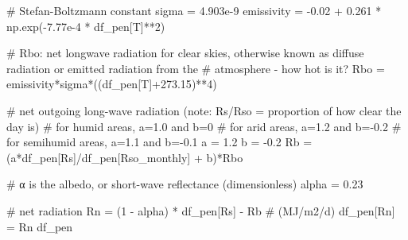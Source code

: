 \documentclass[
  letterpaper,
  DIV=11,
  numbers=noendperiod]{scrreprt}
\newenvironment{Shaded}{\begin{snugshade}}{\end{snugshade}}
\newcommand{\CommentTok}[1]{\textcolor[rgb]{0.37,0.37,0.37}{#1}}
\newcommand{\DecValTok}[1]{\textcolor[rgb]{0.68,0.00,0.00}{#1}}
\newcommand{\FloatTok}[1]{\textcolor[rgb]{0.68,0.00,0.00}{#1}}
\newcommand{\NormalTok}[1]{\textcolor[rgb]{0.00,0.23,0.31}{#1}}
\newcommand{\OperatorTok}[1]{\textcolor[rgb]{0.37,0.37,0.37}{#1}}
\newcommand{\StringTok}[1]{\textcolor[rgb]{0.13,0.47,0.30}{#1}}
\begin{document}
\begin{Shaded}
\begin{Highlighting}[]
\CommentTok{\# Stefan{-}Boltzmann constant}
\NormalTok{sigma }\OperatorTok{=} \FloatTok{4.903e{-}9}
\NormalTok{emissivity }\OperatorTok{=} \OperatorTok{{-}}\FloatTok{0.02} \OperatorTok{+} \FloatTok{0.261} \OperatorTok{*}\NormalTok{ np.exp(}\OperatorTok{{-}}\FloatTok{7.77e{-}4} \OperatorTok{*}\NormalTok{ df\_pen[}\StringTok{\textquotesingle{}T\textquotesingle{}}\NormalTok{]}\OperatorTok{**}\DecValTok{2}\NormalTok{)}

\CommentTok{\# Rbo: net longwave radiation for clear skies, otherwise known as diffuse radiation or emitted radiation from the}
\CommentTok{\# atmosphere {-} \textquotesingle{}how hot is it?\textquotesingle{}}
\NormalTok{Rbo }\OperatorTok{=}\NormalTok{ emissivity}\OperatorTok{*}\NormalTok{sigma}\OperatorTok{*}\NormalTok{((df\_pen[}\StringTok{\textquotesingle{}T\textquotesingle{}}\NormalTok{]}\OperatorTok{+}\FloatTok{273.15}\NormalTok{)}\OperatorTok{**}\DecValTok{4}\NormalTok{)}

\CommentTok{\# net outgoing long{-}wave radiation (note: Rs/Rso = proportion of how clear the day is)}
\CommentTok{\# for humid areas, a=1.0 and b=0}
\CommentTok{\# for arid areas, a=1.2 and b={-}0.2}
\CommentTok{\# for semihumid areas, a=1.1 and b={-}0.1}
\NormalTok{a }\OperatorTok{=} \FloatTok{1.2}
\NormalTok{b }\OperatorTok{=} \OperatorTok{{-}}\FloatTok{0.2}
\NormalTok{Rb }\OperatorTok{=}\NormalTok{ (a}\OperatorTok{*}\NormalTok{df\_pen[}\StringTok{\textquotesingle{}Rs\textquotesingle{}}\NormalTok{]}\OperatorTok{/}\NormalTok{df\_pen[}\StringTok{\textquotesingle{}Rso\_monthly\textquotesingle{}}\NormalTok{] }\OperatorTok{+}\NormalTok{ b)}\OperatorTok{*}\NormalTok{Rbo   }

\CommentTok{\# α is the albedo, or short{-}wave reflectance (dimensionless)}
\NormalTok{alpha }\OperatorTok{=} \FloatTok{0.23}

\CommentTok{\# net radiation}
\NormalTok{Rn }\OperatorTok{=}\NormalTok{ (}\DecValTok{1} \OperatorTok{{-}}\NormalTok{ alpha) }\OperatorTok{*}\NormalTok{ df\_pen[}\StringTok{\textquotesingle{}Rs\textquotesingle{}}\NormalTok{] }\OperatorTok{{-}}\NormalTok{ Rb   }\CommentTok{\# (MJ/m2/d)}
\NormalTok{df\_pen[}\StringTok{\textquotesingle{}Rn\textquotesingle{}}\NormalTok{] }\OperatorTok{=}\NormalTok{ Rn}
\NormalTok{df\_pen}
\end{Highlighting}
\end{Shaded}
\end{document}
